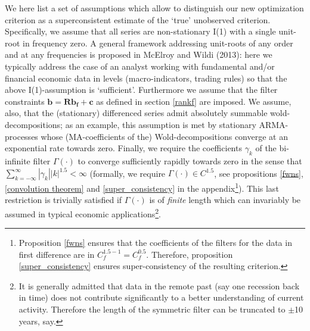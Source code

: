 \documentclass[11pt]{article}
\begin{document}
We here list a set of assumptions which allow to distinguish our new optimization criterion as a superconsistent estimate of the `true' unobserved criterion. Specifically, we assume that all series are non-stationary I(1) with a single unit-root in frequency zero. A general framework addressing unit-roots of any order and at any frequencies is proposed in McElroy and Wildi (2013): here we typically address the case of an analyst working with fundamental and/or financial economic data in levels (macro-indicators, trading rules) so that the above I(1)-assumption is `sufficient'. Furthermore we assume that the filter constraints $\mathbf{b=Rb_f+c}$ as defined in section \ref{rankf} are imposed. We assume, also, that the (stationary) differenced series admit absolutely summable wold-decompositions; as an example, this assumption is met by stationary ARMA-processes whose (MA-coefficients of the)  Wold-decompositions converge at an exponential rate towards zero. Finally, we require the coefficients $\gamma_k$ of the bi-infinite filter $\Gamma(\cdot)$ to converge sufficiently rapidly towards zero in the sense that $\sum_{k=-\infty}^{\infty}|\gamma_k||k|^{1.5}<\infty$ (formally, we require $\Gamma(\cdot)\in C^{1.5}$, see propositions \ref{fwns}, \ref{convolution theorem} and \ref{super_consistency} in the appendix\footnote{Proposition \ref{fwns} ensures that the coefficients of the filters for the data in first difference are in $C_f^{1.5-1}=C_f^{0.5}$. Therefore, proposition \ref{super_consistency} ensures super-consistency of the resulting criterion.}). This last restriction is trivially satisfied if $\Gamma(\cdot)$ is of \emph{finite} length which can invariably be assumed in typical economic applications\footnote{It is generally admitted that data in the remote past (say one recession back in time) does not contribute significantly to a better understanding of current activity. Therefore the length of the symmetric filter can be truncated to $\pm$10 years, say.}. \\
\end{document}
